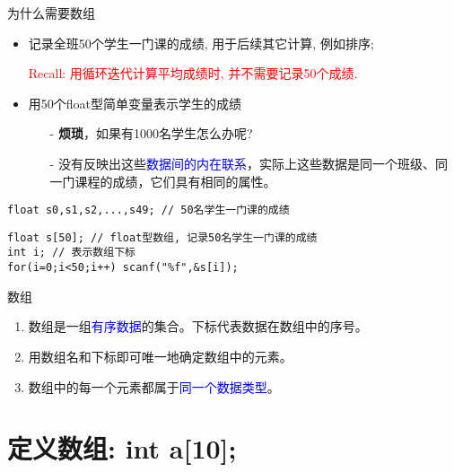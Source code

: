 
\begin{frame}{为什么需要数组}
\vspace{-0.2cm}
\begin{itemize}
	\item 记录全班50个学生一门课的成绩, 用于后续其它计算, 例如排序;
	
		\textcolor{red}{Recall: 用循环迭代计算平均成绩时, 并不需要记录50个成绩}. 
	\item 用50个float型简单变量表示学生的成绩
	\begin{itemize}
		\item[-] \textbf{烦琐}，如果有1000名学生怎么办呢?
		\item[-] 没有反映出这些\textcolor{blue}{数据间的内在联系}，实际上这些数据是同一个班级、同一门课程的成绩，它们具有相同的属性。
	\end{itemize}
\end{itemize}
\vspace{-0.2cm}
\lstinline|float s0,s1,s2,...,s49; // 50名学生一门课的成绩|
\vspace{-0.2cm}
\pause
\begin{lstlisting}
float s[50]; // float型数组, 记录50名学生一门课的成绩
int i; // 表示数组下标
for(i=0;i<50;i++) scanf("%f",&s[i]);
\end{lstlisting}
\vspace{-0.4cm}
\begin{block}{数组}
	\begin{enumerate}
		\item 数组是一组\textcolor{blue}{有序数据}的集合。下标代表数据在数组中的序号。
		\item 用数组名和下标即可唯一地确定数组中的元素。
		\item 数组中的每一个元素都属于\textcolor{blue}{同一个数据类型}。
	\end{enumerate}
\end{block}
\end{frame}

\section{定义数组: int a[10];}

